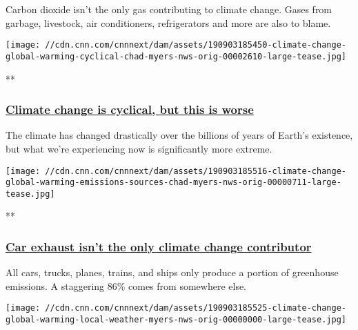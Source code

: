 Carbon dioxide isn't the only gas contributing to climate change. Gases
from garbage, livestock, air conditioners, refrigerators and more are
also to blame.

\href{/videos/weather/2019/09/03/climate-change-global-warming-cyclical-chad-myers-nws-orig.cnn}{}

\texttt{[image: //cdn.cnn.com/cnnnext/dam/assets/190903185450-climate-change-global-warming-cyclical-chad-myers-nws-orig-00002610-large-tease.jpg]}

**

\hypertarget{climate-change-is-cyclical-but-this-is-worse}{%
\subsubsection{\texorpdfstring{\href{/videos/weather/2019/09/03/climate-change-global-warming-cyclical-chad-myers-nws-orig.cnn}{Climate
change is cyclical, but this is
worse}}{Climate change is cyclical, but this is worse}}\label{climate-change-is-cyclical-but-this-is-worse}}

The climate has changed drastically over the billions of years of
Earth's existence, but what we're experiencing now is significantly more
extreme.

\href{/videos/weather/2019/09/03/climate-change-global-warming-emissions-sources-chad-myers-nws-orig.cnn}{}

\texttt{[image: //cdn.cnn.com/cnnnext/dam/assets/190903185516-climate-change-global-warming-emissions-sources-chad-myers-nws-orig-00000711-large-tease.jpg]}

**

\hypertarget{car-exhaust-isnt-the-only-climate-change-contributor-}{%
\subsubsection{\texorpdfstring{\href{/videos/weather/2019/09/03/climate-change-global-warming-emissions-sources-chad-myers-nws-orig.cnn}{Car
exhaust isn't the only climate change contributor
}}{Car exhaust isn't the only climate change contributor }}\label{car-exhaust-isnt-the-only-climate-change-contributor-}}

All cars, trucks, planes, trains, and ships only produce a portion of
greenhouse emissions. A staggering 86\% comes from somewhere else.

\href{/videos/weather/2019/09/03/climate-change-global-warming-local-weather-myers-nws-orig.cnn}{}

\texttt{[image: //cdn.cnn.com/cnnnext/dam/assets/190903185525-climate-change-global-warming-local-weather-myers-nws-orig-00000000-large-tease.jpg]}

